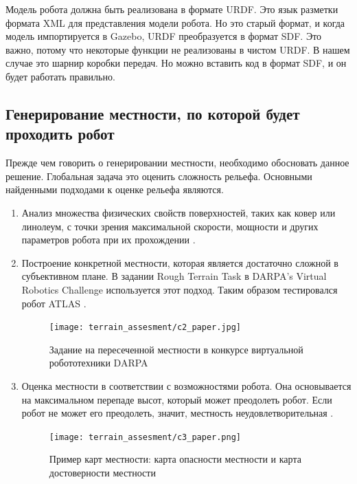 Модель робота должна быть реализована в формате URDF. Это язык разметки формата XML для представления модели робота. Но это старый формат, и когда модель импортируется в Gazebo, URDF преобразуется в формат SDF. Это важно, потому что некоторые функции не реализованы в чистом URDF. В нашем случае это шарнир коробки передач. Но можно вставить код в формат SDF, и он будет работать правильно.

\subsection{Генерирование местности, по которой будет проходить робот}
Прежде чем говорить о генерировании местности, необходимо обосновать данное решение. Глобальная задача это оценить сложность рельефа. Основными найденными подходами к оценке рельефа являются.
\begin{enumerate} 
    \item Анализ множества физических свойств поверхностей, таких как ковер или линолеум, с точки зрения максимальной скорости, мощности и других параметров робота при их прохождении \cite{Altendorfer2001}.
    \item Построение конкретной местности, которая является достаточно сложной в субъективном плане. В задании Rough Terrain Task в DARPA's Virtual Robotics Challenge используется этот подход. Таким образом тестировался робот ATLAS \cite{feng_Optimizationbased_2015} .
          
          \begin{figure}[H]
              \centering\texttt{[image: terrain\_assesment/c2\_paper.jpg]}
              \caption{Задание на пересеченной местности в конкурсе виртуальной робототехники DARPA}
              \label{fig:terrain_assesment/c2_paper.jpg}
          \end{figure}
          
    \item Оценка местности в соответствии с возможностями робота. Она основывается на максимальном перепаде высот, который может преодолеть робот. Если робот не может его преодолеть, значит, местность неудовлетворительная \cite{hung_Advanced_2004,Howard2000} .
          
          \begin{figure}[H]
              \centering\texttt{[image: terrain\_assesment/c3\_paper.png]}
              \caption{Пример карт местности: карта опасности местности и карта достоверности местности}
              \label{fig:terrain_assesment/c3_paper.png}
          \end{figure}


\end{enumerate}
